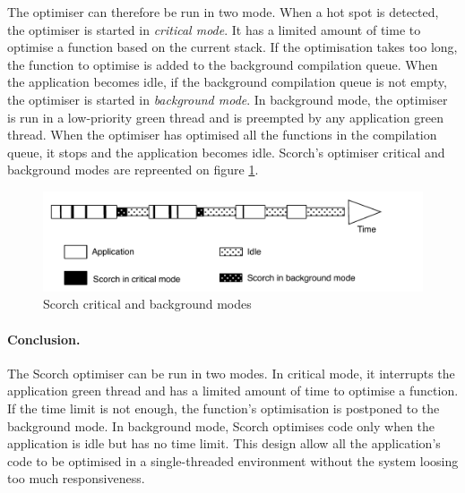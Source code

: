 \documentclass[a4paper,12pt,twoside]{../includes/ThesisStyle}
\begin{document}
The optimiser can therefore be run in two mode. When a hot spot is detected, the optimiser is started in \emph{critical mode}. It has a limited amount of time to optimise a function based on the current stack. If the optimisation takes too long, the function to optimise is added to the background compilation queue. When the application becomes idle, if the background compilation queue is not empty, the optimiser is started in \emph{background mode}. In background mode, the optimiser is run in a low-priority green thread and is preempted by any application green thread. When the optimiser has optimised all the functions in the compilation queue, it stops and the application becomes idle. Scorch's optimiser critical and background modes are repreented on figure \ref{fig:ScorchModes}.

\begin{figure}[h!]
    \begin{center}
        \includegraphics[width=0.95\linewidth]{ScorchModes}
        \caption{Scorch critical and background modes}
        \label{fig:ScorchModes}
    \end{center}
\end{figure}


\paragraph{Conclusion.}The Scorch optimiser can be run in two modes. In critical mode, it interrupts the application green thread and has a limited amount of time to optimise a function. If the time limit is not enough, the function's optimisation is postponed to the background mode. In background mode, Scorch optimises code only when the application is idle but has no time limit. This design allow all the application's code to be optimised in a single-threaded environment without the system loosing too much responsiveness.
\end{document}
